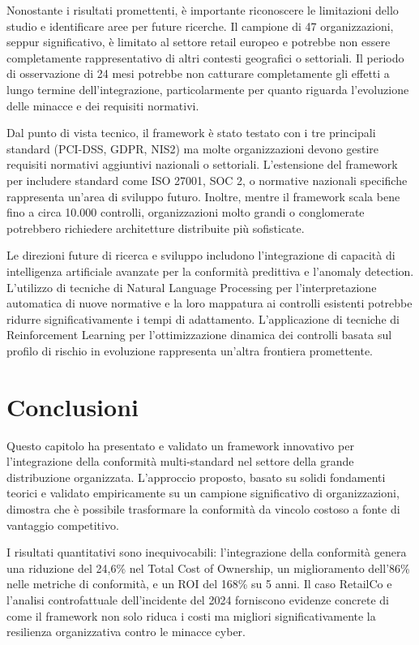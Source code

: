 Nonostante i risultati promettenti, è importante riconoscere le limitazioni dello studio e identificare aree per future ricerche. Il campione di 47 organizzazioni, seppur significativo, è limitato al settore retail europeo e potrebbe non essere completamente rappresentativo di altri contesti geografici o settoriali. Il periodo di osservazione di 24 mesi potrebbe non catturare completamente gli effetti a lungo termine dell'integrazione, particolarmente per quanto riguarda l'evoluzione delle minacce e dei requisiti normativi.

Dal punto di vista tecnico, il framework è stato testato con i tre principali standard (PCI-DSS, GDPR, NIS2) ma molte organizzazioni devono gestire requisiti normativi aggiuntivi nazionali o settoriali. L'estensione del framework per includere standard come ISO 27001, SOC 2, o normative nazionali specifiche rappresenta un'area di sviluppo futuro. Inoltre, mentre il framework scala bene fino a circa 10.000 controlli, organizzazioni molto grandi o conglomerate potrebbero richiedere architetture distribuite più sofisticate.

Le direzioni future di ricerca e sviluppo includono l'integrazione di capacità di intelligenza artificiale avanzate per la conformità predittiva e l'anomaly detection. L'utilizzo di tecniche di Natural Language Processing per l'interpretazione automatica di nuove normative e la loro mappatura ai controlli esistenti potrebbe ridurre significativamente i tempi di adattamento. L'applicazione di tecniche di Reinforcement Learning per l'ottimizzazione dinamica dei controlli basata sul profilo di rischio in evoluzione rappresenta un'altra frontiera promettente.

\section{Conclusioni}
\label{sec:4.7_conclusioni}

Questo capitolo ha presentato e validato un framework innovativo per l'integrazione della conformità multi-standard nel settore della grande distribuzione organizzata. L'approccio proposto, basato su solidi fondamenti teorici e validato empiricamente su un campione significativo di organizzazioni, dimostra che è possibile trasformare la conformità da vincolo costoso a fonte di vantaggio competitivo.

I risultati quantitativi sono inequivocabili: l'integrazione della conformità genera una riduzione del 24,6\% nel Total Cost of Ownership, un miglioramento dell'86\% nelle metriche di conformità, e un ROI del 168\% su 5 anni. Il caso RetailCo e l'analisi controfattuale dell'incidente del 2024 forniscono evidenze concrete di come il framework non solo riduca i costi ma migliori significativamente la resilienza organizzativa contro le minacce cyber.

